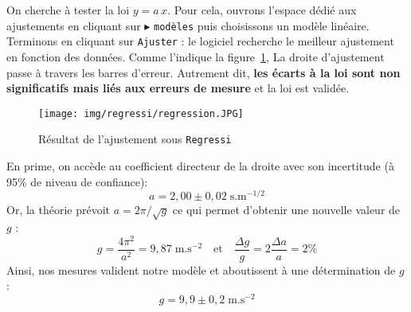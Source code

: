 On cherche à tester la loi $y=a\,x$. Pour cela, ouvrons l'espace dédié aux ajustements en cliquant sur  $\blacktriangleright$ \texttt{modèles} puis choisissons un modèle linéaire. Terminons en cliquant sur \texttt{Ajuster} : le logiciel recherche le meilleur ajustement en fonction des données. Comme l'indique la figure~\ref{fig:fig_regression}, La droite d'ajustement passe à travers les barres d'erreur. Autrement dit, \textbf{les écarts à la loi sont non significatifs mais liés aux erreurs de mesure} et la loi est validée.
\begin{figure}[ht]
  \centering
    \texttt{[image: img/regressi/regression.JPG]}
  \caption{Résultat de l'ajustement sous \texttt{Regressi}}
  \label{fig:fig_regression}
\end{figure}

En prime, on accède au coefficient directeur de la droite avec son incertitude (à 95\% de  niveau de confiance):
\[
	a=2,00\pm 0,02\;\mathrm{s.m^{-1/2}}
\]
Or, la théorie prévoit $a=2\pi/\sqrt g$ ce qui permet d'obtenir une nouvelle valeur de $g$ :
		\[g=\frac{4\pi^2}{a^2}=9,87\;\mathrm{m.s^{-2}}
		\quad\text{et}\quad
		\frac{\Delta g}{g}=2\frac{\Delta a}{a}=2\%
		\] 
Ainsi, nos mesures valident notre modèle et aboutissent à une détermination de $g$ :
\[
	g=9,9\pm0,2\;\mathrm{m.s^{-2}}
\]
